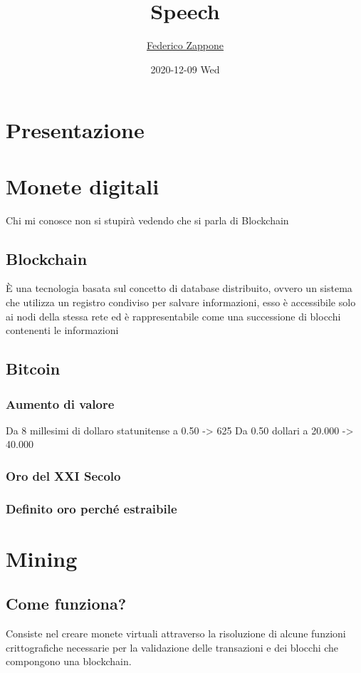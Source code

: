 \documentclass[11pt]{article}
\author{\href{mailto:f.zappone1@studenti.unimol.it}{Federico Zappone}}
\date{2020-12-09 Wed}
\title{Speech}
\begin{document}
\maketitle
\tableofcontents


\section{Presentazione}
\label{sec:orgb8629ee}
\section{Monete digitali}
\label{sec:org2a0f6cf}
Chi mi conosce non si stupirà vedendo che si parla di Blockchain
\subsection{Blockchain}
\label{sec:orgb90a2d8}
È una tecnologia basata sul concetto di database distribuito, ovvero un sistema che utilizza un registro condiviso per salvare informazioni, esso è accessibile solo ai nodi della stessa rete ed è rappresentabile come una successione di blocchi contenenti le informazioni
\subsection{Bitcoin}
\label{sec:orga300de4}
\subsubsection{Aumento di valore}
\label{sec:orgc32d8b2}
Da 8 millesimi di dollaro statunitense a 0.50 -> 625
Da 0.50 dollari a 20.000 -> 40.000
\subsubsection{Oro del XXI Secolo}
\label{sec:orgae4d361}
\subsubsection{Definito oro perché estraibile}
\label{sec:orga5a26d8}
\section{Mining}
\label{sec:orgf932c17}
\subsection{Come funziona?}
\label{sec:org796bb44}
Consiste nel creare monete virtuali attraverso la risoluzione di alcune funzioni crittografiche necessarie per la validazione delle transazioni e dei blocchi che compongono una blockchain.
\end{document}
